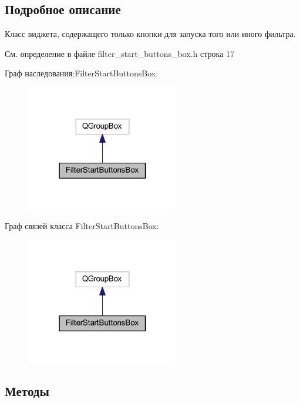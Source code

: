 \subsection{Подробное описание}
Класс виджета, содержащего только кнопки для запуска того или иного фильтра. 

См. определение в файле filter\+\_\+start\+\_\+buttons\+\_\+box.\+h строка 17



Граф наследования\+:Filter\+Start\+Buttons\+Box\+:
\nopagebreak
\begin{figure}[H]
\begin{center}
\leavevmode
\includegraphics[width=190pt]{class_filter_start_buttons_box__inherit__graph}
\end{center}
\end{figure}


Граф связей класса Filter\+Start\+Buttons\+Box\+:
\nopagebreak
\begin{figure}[H]
\begin{center}
\leavevmode
\includegraphics[width=190pt]{class_filter_start_buttons_box__coll__graph}
\end{center}
\end{figure}


\subsection{Методы}
\hypertarget{class_filter_start_buttons_box_a8e47c16d04fd134af5475f77a2bbeb52}{}\label{class_filter_start_buttons_box_a8e47c16d04fd134af5475f77a2bbeb52} 
